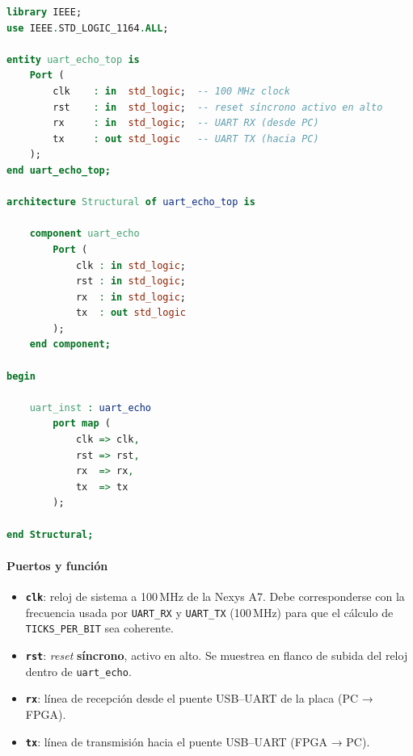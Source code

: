 \documentclass[a4paper,12pt]{article}
\begin{document}
\begin{lstlisting}[language=VHDL, caption={Código completo del módulo UART\_ECHO\_TOP}, label={lst:uart_echo_top}]
library IEEE;
use IEEE.STD_LOGIC_1164.ALL;

entity uart_echo_top is
    Port (
        clk    : in  std_logic;  -- 100 MHz clock
        rst    : in  std_logic;  -- reset síncrono activo en alto
        rx     : in  std_logic;  -- UART RX (desde PC)
        tx     : out std_logic   -- UART TX (hacia PC)
    );
end uart_echo_top;

architecture Structural of uart_echo_top is

    component uart_echo
        Port (
            clk : in std_logic;
            rst : in std_logic;
            rx  : in std_logic;
            tx  : out std_logic
        );
    end component;

begin

    uart_inst : uart_echo
        port map (
            clk => clk,
            rst => rst,
            rx  => rx,
            tx  => tx
        );

end Structural;
\end{lstlisting}

\paragraph{Puertos y función}
\begin{itemize}
  \item \textbf{\texttt{clk}}: reloj de sistema a 100\,MHz de la Nexys A7. Debe corresponderse con la frecuencia usada por \texttt{UART\_RX} y \texttt{UART\_TX} (100\,MHz) para que el cálculo de \texttt{TICKS\_PER\_BIT} sea coherente.
  \item \textbf{\texttt{rst}}: \emph{reset} \textbf{síncrono}, activo en alto. Se muestrea en flanco de subida del reloj dentro de \texttt{uart\_echo}.
  \item \textbf{\texttt{rx}}: línea de recepción desde el puente USB–UART de la placa (PC → FPGA).
  \item \textbf{\texttt{tx}}: línea de transmisión hacia el puente USB–UART (FPGA → PC).
\end{itemize}
\end{document}
